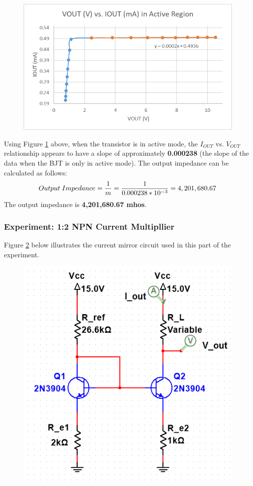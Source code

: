 \documentclass{article}
\begin{document}
	\begin{figure}[!ht]
		\centering
		\includegraphics[width=0.8\linewidth]{vout_vs_iout_slope.png}
		\label{f14}
	\end{figure}
	
	\pagebreak
	
	\noindent Using Figure \ref{f14} above, when the transistor is in active mode, the $I_{OUT}$ vs. $V_{OUT}$ relationship appears to have a slope of approximately \textbf{0.000238} (the slope of the data when the BJT is only in active mode). The output impedance can be calculated as follows: $$Output \hspace{1mm} Impedance = \frac{1}{m} = \frac{1}{0.000238 * 10^{-3}} = 4,201,680.67$$
	The output impedance is \textbf{4,201,680.67 mhos}.
	
	\pagebreak
	
	\subsubsection{Experiment: 1:2 NPN Current Multipllier}
	Figure \ref{f15} below illustrates the current mirror circuit used in this part of the experiment.
	\begin{figure}[!ht]
		\centering
		\includegraphics[width=0.55\linewidth]{d1-part3-circuit-npn-1_2.png}
		\label{f15}
	\end{figure}
	
\end{document}
